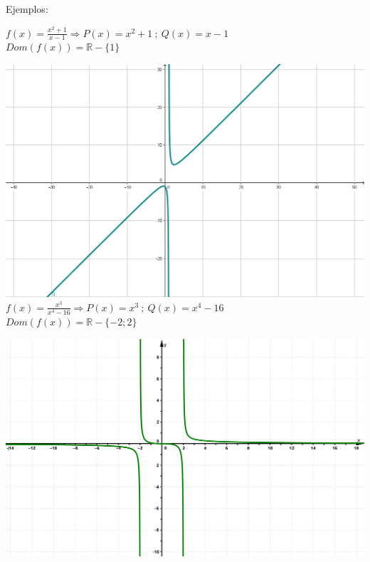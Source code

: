 \documentclass[a4paper,11pt,spanish,sans]{exam}
\begin{document}
Ejemplos:\\
 
\begin{minipage}{0.45\textwidth}
$f(x)=\frac{x^2+1}{x-1} \Rightarrow P(x)=x^2+1 \: ; \: Q(x)=x-1$\\
$Dom(f(x))=\mathbb{R} - \lbrace 1\rbrace$

\includegraphics[width= \linewidth]{ejemplo3guia.png}\\

$f(x)=\frac{x^3}{x^4-16} \Rightarrow P(x)=x^3 \: ; \: Q(x)=x^4-16$\\
$Dom(f(x))=\mathbb{R} - \lbrace -2; 2\rbrace$

\includegraphics[width= \linewidth]{ejemplorac5.png}



\end{minipage}
\end{document}
